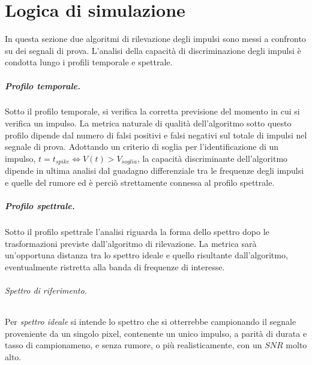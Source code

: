 

\chapter{Logica di simulazione}
\label{capitolo:logica}
\graphicspath{{Graph/}}




In questa sezione due algoritmi di rilevazione degli impulsi sono messi a confronto su dei segnali di prova. L'analisi della capacità di discriminazione degli impulsi è condotta lungo i profili temporale e spettrale.


\paragraph{Profilo temporale.}
Sotto il profilo temporale, si verifica la corretta previsione del momento in cui si verifica un impulso. La metrica naturale di qualità dell'algoritmo sotto questo profilo dipende dal numero di falsi positivi e falsi negativi sul totale di impulsi nel segnale di prova. Adottando un criterio di soglia per l'identificazione di un impulso, $t=t_{spike} \Leftrightarrow V(t)>V_{soglia}$, la capacità discriminante dell'algoritmo dipende in ultima analisi dal guadagno differenziale tra le frequenze degli impulsi e quelle del rumore ed è perciò strettamente connessa al profilo spettrale.


\paragraph{Profilo spettrale.}
Sotto il profilo spettrale l'analisi riguarda la forma dello spettro dopo le trasformazioni previste dall'algoritmo di rilevazione. La metrica sarà un'opportuna distanza tra lo spettro ideale e quello risultante dall'algoritmo, eventualmente ristretta alla banda di frequenze di interesse.


\subparagraph{Spettro di riferimento.}
Per {\it spettro ideale} si intende lo spettro che si otterrebbe campionando il segnale proveniente da un singolo pixel, contenente un unico impulso, a parità di durata e tasso di campionameno, e senza rumore, o più realisticamente, con un $SNR$ molto alto.






